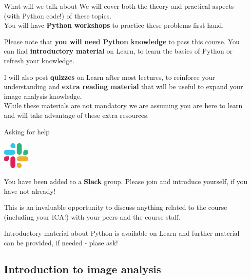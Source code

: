 \documentclass[9pt, aspectratio=169]{beamer}
\begin{document}
\begin{frame}
    {What will we talk about}
    We will cover both the theory and practical aspects (with Python code!) of these topics.\\

    You will have \textbf{Python workshops} to practice these problems first hand.\\

    \pause

    Please note that \textbf{you will need Python knowledge} to pass this course. You can find \textbf{introductory material} on Learn, to learn the basics of Python or refresh your knowledge.

    \pause

    I will also post \textbf{quizzes} on Learn after most lectures, to reinforce your understanding and \textbf{extra reading material} that will be useful to expand your image analysis knowledge. \\
    
    \vspace{1em}
    While these materials are not mandatory we are assuming you are here to learn and will take advantage of these extra resources.
\end{frame}

\begin{frame}
    {Asking for help}
    \begin{center}
        \includegraphics[width=0.1\textwidth]{slack.png}
    \end{center}

    You have been added to a \textbf{Slack} group. Please join and introduce yourself, if you have not already!

    This is an invaluable opportunity to discuss anything related to the course (including your ICA!) with your peers and the course staff.    

    Introductory material about Python is available on Learn and further material can be provided, if needed - plase ask!    
\end{frame}

\begin{frame}
    \section {Introduction to image analysis}
\end{frame}
\end{document}
